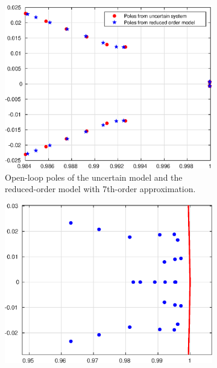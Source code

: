 \documentclass[letterpaper, 10 pt, conference]{ieeeconf}  %
\begin{document}
%
%
%
%
%




\begin{figure}[!ht]
\begin{subfigure}[t]{0.23\textwidth}
   \includegraphics[width=\textwidth]{figs/openLoopPoles.eps}
   \caption{Open-loop poles of the uncertain model and the reduced-order model with 7th-order approximation.}
   \label{olPoles}
   \end{subfigure}\hfill
   \begin{subfigure}[t]{0.23\textwidth}
    \includegraphics[width=\textwidth]{figs/clLoopPoles.eps}

\end{subfigure}
\end{figure}
\end{document}
